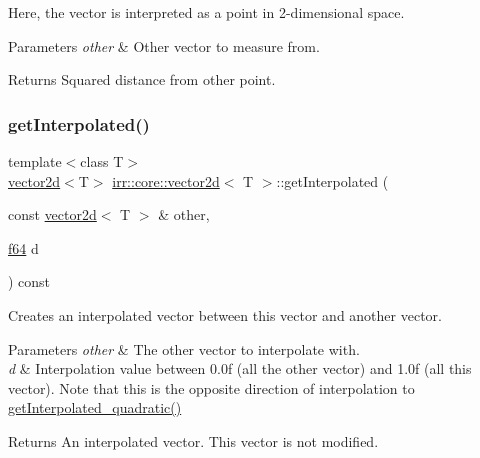 Here, the vector is interpreted as a point in 2-\/dimensional space. 
\begin{DoxyParams}{Parameters}
{\em other} & Other vector to measure from. \\
\hline
\end{DoxyParams}
\begin{DoxyReturn}{Returns}
Squared distance from other point. 
\end{DoxyReturn}
\mbox{\label{classirr_1_1core_1_1vector2d_ac800722ea56bf8878dc7b67d490464c3}} 
\subsubsection{\texorpdfstring{get\+Interpolated()}{getInterpolated()}}
{\footnotesize\ttfamily template$<$class T$>$ \\
\hyperlink{classirr_1_1core_1_1vector2d}{vector2d}$<$T$>$ \hyperlink{classirr_1_1core_1_1vector2d}{irr\+::core\+::vector2d}$<$ T $>$\+::get\+Interpolated (\begin{DoxyParamCaption}\item[{const \hyperlink{classirr_1_1core_1_1vector2d}{vector2d}$<$ T $>$ \&}]{other,  }\item[{\hyperlink{namespaceirr_a1325b02603ad449f92c68fc640af9b28}{f64}}]{d }\end{DoxyParamCaption}) const\hspace{0.3cm}{\ttfamily [inline]}}



Creates an interpolated vector between this vector and another vector. 


\begin{DoxyParams}{Parameters}
{\em other} & The other vector to interpolate with. \\
\hline
{\em d} & Interpolation value between 0.\+0f (all the other vector) and 1.\+0f (all this vector). Note that this is the opposite direction of interpolation to \hyperlink{classirr_1_1core_1_1vector2d_aa4bfe9ae4f1e354eeac2ee8d9c2ca7fd}{get\+Interpolated\+\_\+quadratic()} \\
\hline
\end{DoxyParams}
\begin{DoxyReturn}{Returns}
An interpolated vector. This vector is not modified. 
\end{DoxyReturn}
\mbox{\label{classirr_1_1core_1_1vector2d_aa4bfe9ae4f1e354eeac2ee8d9c2ca7fd}} 
